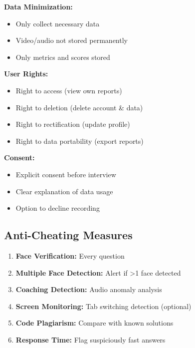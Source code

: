 \documentclass[12pt,a4paper]{article}
\begin{document}
\begin{tcolorbox}[colback=primaryblue!5,colframe=primaryblue,title=\textbf{GDPR Compliance}]
\textbf{Data Minimization:}
\begin{itemize}
    \item Only collect necessary data
    \item Video/audio not stored permanently
    \item Only metrics and scores stored
\end{itemize}

\textbf{User Rights:}
\begin{itemize}
    \item Right to access (view own reports)
    \item Right to deletion (delete account \& data)
    \item Right to rectification (update profile)
    \item Right to data portability (export reports)
\end{itemize}

\textbf{Consent:}
\begin{itemize}
    \item Explicit consent before interview
    \item Clear explanation of data usage
    \item Option to decline recording
\end{itemize}
\end{tcolorbox}

\subsection{Anti-Cheating Measures}

\begin{enumerate}
    \item \textbf{Face Verification:} Every question
    \item \textbf{Multiple Face Detection:} Alert if >1 face detected
    \item \textbf{Coaching Detection:} Audio anomaly analysis
    \item \textbf{Screen Monitoring:} Tab switching detection (optional)
    \item \textbf{Code Plagiarism:} Compare with known solutions
    \item \textbf{Response Time:} Flag suspiciously fast answers
\end{enumerate}

\newpage
\end{document}
